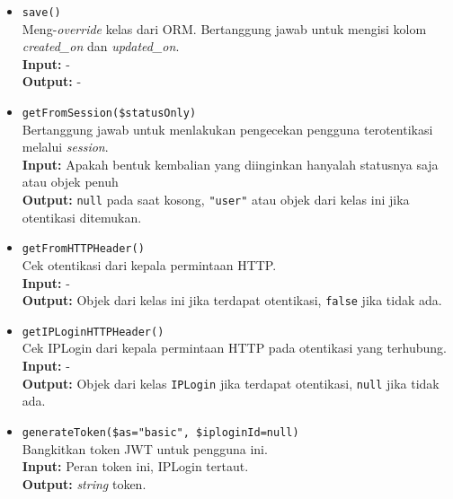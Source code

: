\begin{itemize}
\begin{itemize}
                \item \texttt{save()} \\
                    Meng-\textit{override} kelas dari ORM. Bertanggung jawab
                    untuk mengisi kolom \textit{created\_on} dan
                    \textit{updated\_on}.\\
                    \textbf{Input:} -\\
                    \textbf{Output:} -
                
                \item \texttt{getFromSession(\$statusOnly)} \\
                    Bertanggung jawab untuk menlakukan pengecekan pengguna
                    terotentikasi melalui \textit{session}. \\
                    \textbf{Input:} Apakah bentuk kembalian yang diinginkan
                        hanyalah statusnya saja atau objek penuh\\
                    \textbf{Output:} \texttt{null} pada saat kosong,
                        \texttt{"user"} atau objek dari kelas ini jika
                        otentikasi ditemukan.
                
                \item \texttt{getFromHTTPHeader()} \\
                    Cek otentikasi dari kepala permintaan HTTP. \\
                    \textbf{Input:} - \\
                    \textbf{Output:} Objek dari kelas ini jika terdapat
                        otentikasi, \texttt{false} jika tidak ada.
                
                \item \texttt{getIPLoginHTTPHeader()} \\
                    Cek IPLogin dari kepala permintaan HTTP pada otentikasi yang
                    terhubung. \\
                    \textbf{Input:} -\\
                    \textbf{Output:} Objek dari kelas \texttt{IPLogin} jika
                        terdapat otentikasi, \texttt{null} jika tidak ada.
                
                \item \texttt{generateToken(\$as="basic", \$iploginId=null)} \\
                    Bangkitkan token JWT untuk pengguna ini. \\
                    \textbf{Input:} Peran token ini, IPLogin tertaut.\\
                    \textbf{Output:} \textit{string} token.
                

\end{itemize}
\end{itemize}

